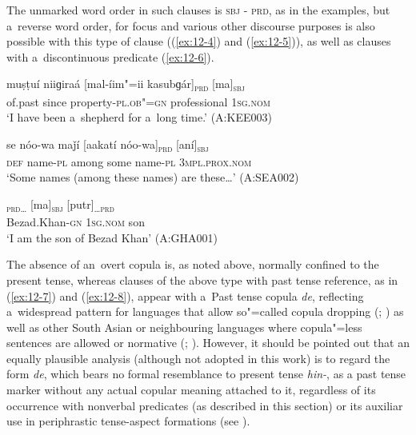 The unmarked word order in such clauses is \textsc{sbj - prd}, as in the examples, but a~reverse word order, for focus and various other discourse purposes is also possible with this type of clause ((\ref{ex:12-4}) and (\ref{ex:12-5})), as well as clauses with a~discontinuous predicate (\ref{ex:12-6}).

\begin{exe}
\ex
\label{ex:12-4}
\gll muṣṭuí niiɡiraá [mal-íim"=ii kasubɡár]\textsubscript{\textsc{prd}} [ma]\textsubscript{\textsc{sbj}} \\
of.past since property-\textsc{pl.ob"=gn} professional \textsc{1sg.nom}  \\
\glt `I have been a~shepherd for a~long time.' (A:KEE003)
\end{exe}
\begin{exe}
\ex
\label{ex:12-5}
\gll se nóo-wa maǰí [aakatí nóo-wa]\textsubscript{\textsc{prd}} [aní]\textsubscript{\textsc{sbj}} \\
\textsc{def} name-\textsc{pl} among some name-\textsc{pl} 3\textsc{mpl.prox.nom} \\
\glt `Some names (among these names) are these{\ldots}' (A:SEA002)
\end{exe}
\begin{exe}
\ex
\label{ex:12-6}
\gll [beezaadxaan-íi]\textsubscript{\textsc{prd{\ldots}}} [ma]\textsubscript{\textsc{sbj}} [putr]\textsubscript{\textsc{{\ldots}prd}} \\
Bezad.Khan-\textsc{gn} \textsc{1sg.nom} son  \\
\glt `I am the son of Bezad Khan' (A:GHA001)
\end{exe}

The absence of an~overt copula is, as noted above, normally confined to the present tense, whereas clauses of the above type with past tense reference, as in (\ref{ex:12-7}) and (\ref{ex:12-8}), appear with a~Past tense copula \textit{de}, reflecting a~widespread pattern for languages that allow so"=called copula dropping (\citealt[34]{pustet2003}; \citealt[120]{givon2001a}) as well as other South Asian or neighbouring languages where copula"=less sentences are allowed or normative (\citealt[339]{masica1991}; \citealt[121]{baart1999a}). However, it should be pointed out that an equally plausible analysis (although not adopted in this work) is to regard the form \textit{de}, which bears no formal resemblance to present tense \textit{hin-}, as a past tense marker without any actual copular meaning attached to it, regardless of its occurrence with nonverbal predicates (as described in this section) or its auxiliar use in periphrastic tense-aspect formations (see ). 

